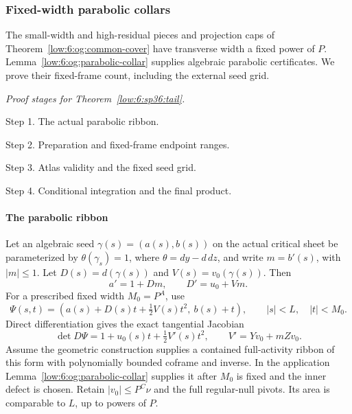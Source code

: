 \documentclass[11pt]{amsart}
\theoremstyle{definition}
\theoremstyle{remark}
\numberwithin{equation}{section}
\begin{document}
\subsubsection{Fixed-width parabolic collars}

The small-width and high-residual pieces and projection caps of Theorem~\ref{low:6:og:common-cover} have transverse width a fixed power of $P$. Lemma~\ref{low:6:og:parabolic-collar} supplies algebraic parabolic certificates. We prove their fixed-frame count, including the external seed grid.

\par\smallskip
\noindent\textit{Proof stages for Theorem~\ref{low:6:sp36:tail}.}\par\nobreak
\noindent\textup{Step 1.} The actual parabolic ribbon.\par\nobreak
\noindent\textup{Step 2.} Preparation and fixed-frame endpoint ranges.\par\nobreak
\noindent\textup{Step 3.} Atlas validity and the fixed seed grid.\par\nobreak
\noindent\textup{Step 4.} Conditional integration and the final product.\par\nobreak
\smallskip

\paragraph{The parabolic ribbon}

Let an algebraic seed $\gamma(s)=(a(s),b(s))$ on the actual critical sheet be parameterized by $\theta(\gamma_s)=1$, where $\theta=dy-d\,dz$, and write $m=b'(s)$, with $|m|\le1$. Let $D(s)=d(\gamma(s))$ and $V(s)=v_0(\gamma(s))$. Then
\[
a'=1+D m,\qquad D'=u_0+Vm.
\]
For a prescribed fixed width $M_0=P^A$, use
\begin{equation}\label{low:6:sp36:ribbon}
\Psi(s,t)=\left(a(s)+D(s)t+\tfrac12V(s)t^2,\ b(s)+t\right),\qquad |s|<L,\quad |t|<M_0.
\end{equation}
Direct differentiation gives the exact tangential Jacobian
\begin{equation}\label{low:6:sp36:jacobian}
\det D\Psi=1+u_0(s)t+\tfrac12V'(s)t^2,\qquad V'=Yv_0+mZv_0.
\end{equation}
Assume the geometric construction supplies a contained full-activity ribbon of this form with polynomially bounded coframe and inverse. In the application Lemma~\ref{low:6:og:parabolic-collar} supplies it after $M_0$ is fixed and the inner defect is chosen. Retain $|v_0|\le P^C\nu$ and the full regular-null pivots. Its area is comparable to $L$, up to powers of $P$.
\end{document}

